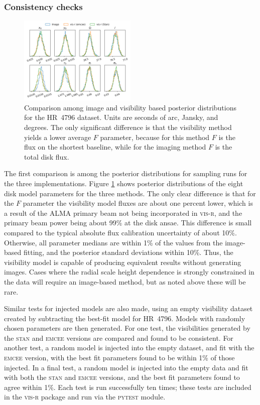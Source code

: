 \documentclass[fleqn,usenatbib]{rasti}
\begin{document}
\subsubsection{Consistency checks}

\begin{figure}
    \centering
    \includegraphics[width=0.5\textwidth]{comp.png}
    \caption{Comparison among image and visibility based posterior distributions for the HR~4796 dataset. Units are seconds of arc, Jansky, and degrees. The only significant difference is that the visibility method yields a lower average $F$ parameter, because for this method $F$ is the flux on the shortest baseline, while for the imaging method $F$ is the total disk flux.}
    \label{fig:comp}
\end{figure}

The first comparison is among the posterior distributions for sampling runs for the three implementations. Figure \ref{fig:comp} shows posterior distributions of the eight disk model parameters for the three methods. The only clear difference is that for the $F$ parameter the visibility model fluxes are about one percent lower, which is a result of the ALMA primary beam not being incorporated in \textsc{vis-r}, and the primary beam power being about 99\% at the disk ansae. This difference is small compared to the typical absolute flux calibration uncertainty of about 10\%. Otherwise, all parameter medians are within 1\% of the values from the image-based fitting, and the posterior standard deviations within 10\%. Thus, the visibility model is capable of producing equivalent results without generating images. Cases where the radial scale height dependence is strongly constrained in the data will require an image-based method, but as noted above these will be rare.

Similar tests for injected models are also made, using an empty visibility dataset created by subtracting the best-fit model for HR~4796. Models with randomly chosen parameters are then generated. For one test, the visibilities generated by the \textsc{stan} and \textsc{emcee} versions are compared and found to be consistent. For another test, a random model is injected into the empty dataset, and fit with the \textsc{emcee} version, with the best fit parameters found to be within 1\% of those injected. In a final test, a random model is injected into the empty data and fit with both the \textsc{stan} and \textsc{emcee} versions, and the best fit parameters found to agree within 1\%. Each test is run successfully ten times; these tests are included in the \textsc{vis-r} package and run via the \textsc{pytest} module.
\end{document}
